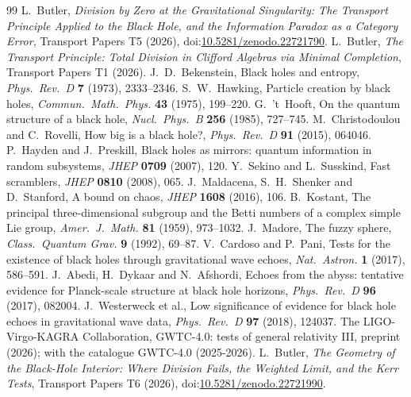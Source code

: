 \documentclass[11pt]{article}
\theoremstyle{definition}
\theoremstyle{plain}
\begin{document}
\begin{thebibliography}{99}
 L.~Butler,
\emph{Division by Zero at the Gravitational Singularity: The Transport Principle Applied to the Black Hole, and the Information Paradox as a Category Error},
Transport Papers T5 (2026), doi:\href{https://doi.org/10.5281/zenodo.22721790}{10.5281/zenodo.22721790}.
 L.~Butler,
\emph{The Transport Principle: Total Division in Clifford Algebras via Minimal Completion},
Transport Papers T1 (2026).
 J.~D.~Bekenstein,
Black holes and entropy,
\emph{Phys.\ Rev.\ D} \textbf{7} (1973), 2333--2346.
 S.~W.~Hawking,
Particle creation by black holes,
\emph{Commun.\ Math.\ Phys.} \textbf{43} (1975), 199--220.
 G.~'t~Hooft,
On the quantum structure of a black hole,
\emph{Nucl.\ Phys.\ B} \textbf{256} (1985), 727--745.
 M.~Christodoulou and C.~Rovelli,
How big is a black hole?,
\emph{Phys.\ Rev.\ D} \textbf{91} (2015), 064046.
 P.~Hayden and J.~Preskill,
Black holes as mirrors: quantum information in random subsystems,
\emph{JHEP} \textbf{0709} (2007), 120.
 Y.~Sekino and L.~Susskind,
Fast scramblers,
\emph{JHEP} \textbf{0810} (2008), 065.
 J.~Maldacena, S.~H.~Shenker and D.~Stanford,
A bound on chaos,
\emph{JHEP} \textbf{1608} (2016), 106.
 B.~Kostant,
The principal three-dimensional subgroup and the Betti numbers of a complex simple Lie group,
\emph{Amer.\ J.\ Math.} \textbf{81} (1959), 973--1032.
 J.~Madore,
The fuzzy sphere,
\emph{Class.\ Quantum Grav.} \textbf{9} (1992), 69--87.
 V.~Cardoso and P.~Pani,
Tests for the existence of black holes through gravitational wave echoes,
\emph{Nat.\ Astron.} \textbf{1} (2017), 586--591.
 J.~Abedi, H.~Dykaar and N.~Afshordi,
Echoes from the abyss: tentative evidence for Planck-scale structure at black hole horizons,
\emph{Phys.\ Rev.\ D} \textbf{96} (2017), 082004.
 J.~Westerweck et al.,
Low significance of evidence for black hole echoes in gravitational wave data,
\emph{Phys.\ Rev.\ D} \textbf{97} (2018), 124037.
 The LIGO-Virgo-KAGRA Collaboration,
GWTC-4.0: tests of general relativity III,
preprint (2026); with the catalogue GWTC-4.0 (2025-2026).
 L.~Butler,
\emph{The Geometry of the Black-Hole Interior: Where Division Fails, the Weighted Limit, and the Kerr Tests},
Transport Papers T6 (2026), doi:\href{https://doi.org/10.5281/zenodo.22721990}{10.5281/zenodo.22721990}.

\end{thebibliography}
\end{document}
